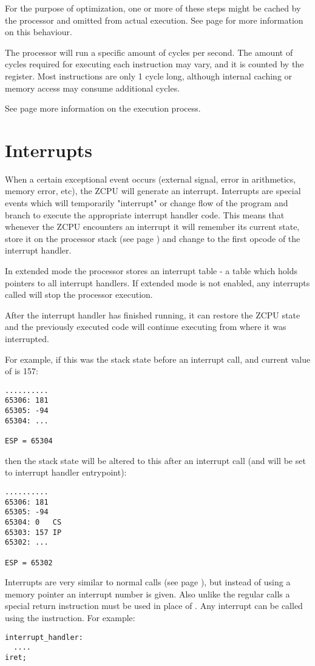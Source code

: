For the purpose of optimization, one or more of these steps might be cached by the processor and omitted from actual execution. See page \pageref{caching} for more information on this behaviour.

The processor will run a specific amount of cycles per second. The amount of cycles required for executing each instruction may vary, and it is counted by the  register. Most instructions are only 1 cycle long, although internal caching or memory access may consume additional cycles.

See page \pageref{advexecution} more information on the execution process.

\section{Interrupts}
When a certain exceptional event occurs (external signal, error in arithmetics, memory error, etc), the ZCPU will generate an interrupt. Interrupts are special events which will temporarily "interrupt" or change flow of the program and branch to execute the appropriate interrupt handler code. This means that whenever the ZCPU encounters an interrupt it will remember its current state, store it on the processor stack (see page \pageref{stack}) and change  to the first opcode of the interrupt handler.

In extended mode the processor stores an interrupt table - a table which holds pointers to all interrupt handlers. If extended mode is not enabled, any interrupts called will stop the processor execution.

After the interrupt handler has finished running, it can restore the ZCPU state and the previously executed code will continue executing from where it was interrupted.

For example, if this was the stack state before an interrupt call, and current value of  is 157:
\begin{verbatim}
..........
65306: 181
65305: -94
65304: ...

ESP = 65304
\end{verbatim}
then the stack state will be altered to this after an interrupt call (and  will be set to interrupt handler entrypoint):
\begin{verbatim}
..........
65306: 181
65305: -94
65304: 0   CS
65303: 157 IP
65302: ...

ESP = 65302
\end{verbatim}

Interrupts are very similar to normal calls (see page \pageref{branching}), but instead of using a memory pointer an interrupt number is given. Also unlike the regular calls a special return instruction  must be used in place of . Any interrupt can be called using the  instruction. For example:
\begin{verbatim}
interrupt_handler:
  ....
iret;
\end{verbatim}

